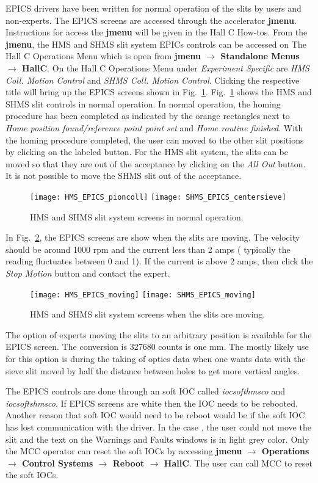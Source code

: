 {EPICS drivers have been written for normal operation of the slits by users and non-experts. The
EPICS screens are accessed through the accelerator {\bf jmenu}. Instructions for access the
  {\bf jmenu} will be given in the Hall C How-tos.
From the  {\bf jmenu}, the HMS and SHMS slit system EPICs controls can be accessed on The Hall C Operations Menu
which is open from {\bf jmenu $\rightarrow$ Standalone Menus $\rightarrow$ HallC}. On the Hall C Operations Menu under
{\it Experiment Specific} are {\it HMS Coll. Motion Control} and {\it SHMS Coll. Motion Control}. Clicking the
respective title will bring up the EPICS screens shown in Fig.~\ref{fig:normal-coll-epics}.  Fig.~\ref{fig:normal-coll-epics}
shows the HMS and SHMS slit controls in normal operation. In normal operation, the homing procedure has been completed
as indicated by the orange rectangles next to {\it Home position found/reference point point set} and {\it Home routine finished}.
With the homing procedure completed, the user can moved to the other slit positions by clicking on the labeled button. For the
HMS slit system, the slits can be moved so that they are out of the acceptance by clicking on the {\it All Out} button.
It is not possible to move the SHMS slit out of the acceptance.
\begin{figure}
\texttt{[image: HMS\_EPICS\_pioncoll]}
\texttt{[image: SHMS\_EPICS\_centersieve]}
\caption{HMS and SHMS slit system screens in normal operation. \label{fig:normal-coll-epics}}
\end{figure}
In Fig.~\ref{fig:moving-coll-epics}, the EPICS screens are show when the slits are moving. The velocity should be around 1000 rpm and
the current less than 2 amps ( typically the reading fluctuates between 0 and 1). If the current is above 2 amps,
then click the {\it Stop Motion} button and contact the expert.
\begin{figure}
\texttt{[image: HMS\_EPICS\_moving]}
\texttt{[image: SHMS\_EPICS\_moving]}
\caption{HMS and SHMS slit system screens when the slits are moving. \label{fig:moving-coll-epics}}
\end{figure}
The option of experts moving the slits to an arbitrary position
is available for the EPICS screen. The conversion is 327680 counts is one mm. The mostly likely use for this option is during the
taking of optics data when one wants data with the sieve slit moved by half the distance between holes to get more vertical angles.

The EPICS controls are done through an soft IOC called {\it  iocsofthmsco} and {\it iocsoftshmsco}. If EPICS screens are white then the IOC
needs to be rebooted. Another reason that soft IOC would need to be reboot would be if the soft IOC has lost communication with the driver.
In the case , the user could not move the slit and the text on the Warnings and Faults windows is in light grey color. Only the MCC operator can
reset the soft IOCs by accessing {\bf jmenu $\rightarrow$ Operations $\rightarrow$ Control Systems $\rightarrow$ Reboot $\rightarrow$ HallC}. The user can
call MCC to reset the soft IOCs.

}
